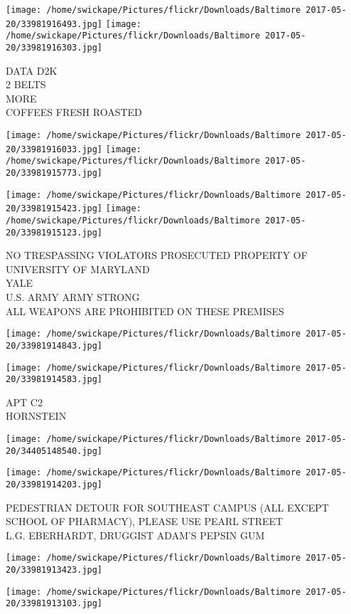 \documentclass[10pt,letterpaper]{article}
\begin{document}
\texttt{[image: /home/swickape/Pictures/flickr/Downloads/Baltimore 2017-05-20/33981916493.jpg]}
\texttt{[image: /home/swickape/Pictures/flickr/Downloads/Baltimore 2017-05-20/33981916303.jpg]}

DATA D2K\\
2 BELTS\\
MORE\\
COFFEES FRESH ROASTED
\pagebreak

\texttt{[image: /home/swickape/Pictures/flickr/Downloads/Baltimore 2017-05-20/33981916033.jpg]}
\texttt{[image: /home/swickape/Pictures/flickr/Downloads/Baltimore 2017-05-20/33981915773.jpg]}

\texttt{[image: /home/swickape/Pictures/flickr/Downloads/Baltimore 2017-05-20/33981915423.jpg]}
\texttt{[image: /home/swickape/Pictures/flickr/Downloads/Baltimore 2017-05-20/33981915123.jpg]}

NO TRESPASSING VIOLATORS PROSECUTED PROPERTY OF UNIVERSITY OF MARYLAND\\
YALE\\
U.S. ARMY ARMY STRONG\\
ALL WEAPONS ARE PROHIBITED ON THESE PREMISES
\pagebreak

\texttt{[image: /home/swickape/Pictures/flickr/Downloads/Baltimore 2017-05-20/33981914843.jpg]}

\vspace{0.25in}
\texttt{[image: /home/swickape/Pictures/flickr/Downloads/Baltimore 2017-05-20/33981914583.jpg]}

APT C2\\
HORNSTEIN
\pagebreak

\texttt{[image: /home/swickape/Pictures/flickr/Downloads/Baltimore 2017-05-20/34405148540.jpg]}

\vspace{0.25in}
\texttt{[image: /home/swickape/Pictures/flickr/Downloads/Baltimore 2017-05-20/33981914203.jpg]}

PEDESTRIAN DETOUR FOR SOUTHEAST CAMPUS (ALL EXCEPT SCHOOL OF PHARMACY), PLEASE USE PEARL STREET\\
L.G. EBERHARDT, DRUGGIST ADAM'S PEPSIN GUM
\pagebreak

\texttt{[image: /home/swickape/Pictures/flickr/Downloads/Baltimore 2017-05-20/33981913423.jpg]}

\vspace{0.25in}
\texttt{[image: /home/swickape/Pictures/flickr/Downloads/Baltimore 2017-05-20/33981913103.jpg]}
\end{document}
